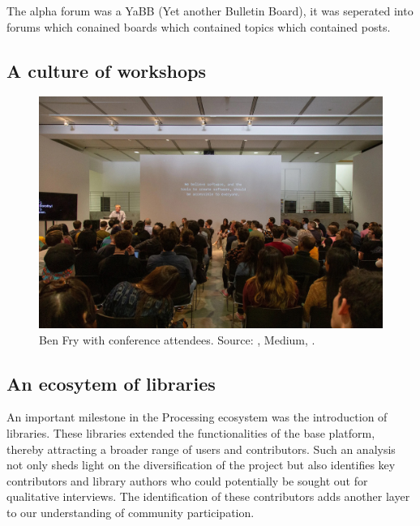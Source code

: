 The alpha forum was a YaBB (Yet another Bulletin Board), it was seperated into forums which conained boards which contained topics which contained posts.




\subsection{A culture of workshops}

\begin{figure}[h]
	\centering
	\includegraphics[width=1\textwidth]{images/pcd_la_2019.jpeg}
	\caption[Ben Fry at PCD 2018]{Ben Fry with conference attendees. Source: , Medium, \citeyear{guptaBenFryConference2018}.}
\end{figure}

\subsection{An ecosytem of libraries}
An important milestone in the Processing ecosystem was the introduction of libraries. These libraries extended the functionalities of the base platform, thereby attracting a broader range of users and contributors. Such an analysis not only sheds light on the diversification of the project but also identifies key contributors and library authors who could potentially be sought out for qualitative interviews. The identification of these contributors adds another layer to our understanding of community participation.

\changepapersize{305.3mm:210mm}

